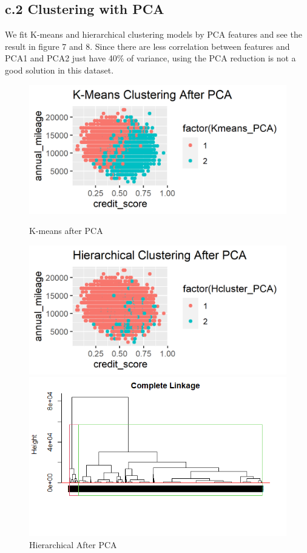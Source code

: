 \documentclass[a4paper, 11pt]{article}
\begin{document}
\subsection*{c.2 Clustering with PCA }
We fit K-means and hierarchical clustering models by PCA features and see the result in figure 7 and 8.
Since there are less correlation between features and PCA1 and PCA2 just have 40\% of variance, using the PCA reduction is not a good solution in this dataset. 
\begin{figure}[H]
	\centering
	\begin{minipage}[b]{.4\textwidth}
		\includegraphics[width=\textwidth]{figure21.png}
		\caption{K-means after PCA}
	\end{minipage}
	\hfill
	\begin{minipage}[b]{.4\textwidth}
		\includegraphics[width=\textwidth]{figure22.png}
		\caption{Hierarchical After PCA}
	\end{minipage}
	\hfill
\begin{minipage}[b]{.4\textwidth}
	\includegraphics[width=\textwidth]{figure7.png}

\end{minipage}
\end{figure}
\end{document}
